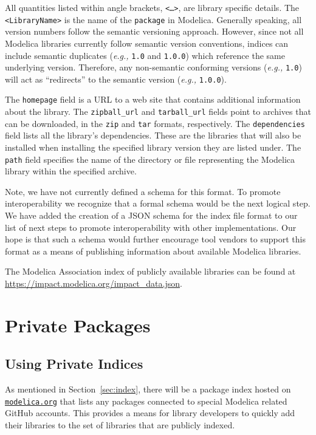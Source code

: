 \documentclass[11pt,a4paper,twocolumn]{article}
\newcommand{\code}[1]{\texttt{#1}} %
\begin{document}
All quantities listed within angle brackets, \code{<\ldots>}, are library
specific details.  The \code{<LibraryName>} is the name of the
\code{package} in Modelica.  Generally speaking, all version numbers
follow the semantic versioning approach.  However, since not all
Modelica libraries currently follow semantic version conventions,
indices can include semantic duplicates (\textit{e.g.,} \code{1.0} and
\code{1.0.0}) which reference the same underlying version.  Therefore,
any non-semantic conforming versions (\textit{e.g.,} \code{1.0}) will
act as ``redirects'' to the semantic version (\textit{e.g.,}
\code{1.0.0}).

The \code{homepage} field is a URL to a web site that contains
additional information about the library.  The \code{zipball\_url} and
\code{tarball\_url} fields point to archives that can be downloaded,
in the \code{zip} and \code{tar} formats, respectively.  The
\code{dependencies} field lists all the library's dependencies.  These
are the libraries that will also be installed when installing the
specified library version they are listed under.  The \code{path}
field specifies the name of the directory or file representing the
Modelica library within the specified archive.

Note, we have not currently defined a schema for this format.  To
promote interoperability we recognize that a formal schema would be the
next logical step.  We have added the creation of a JSON schema for
the index file format to our list of next steps to promote
interoperability with other implementations.  Our hope is that such a
schema would further encourage tool vendors to support this format as
a means of publishing information about available Modelica libraries.

The Modelica Association index of publicly available libraries can
be found at \url{https://impact.modelica.org/impact\_data.json}.

\section{Private Packages}
\label{sec:private}

\subsection{Using Private Indices}
\label{sec:use_private}

As mentioned in Section~\ref{sec:index}, there will be a package index
hosted on \href{https://modelica.org}{\code{modelica.org}} that lists
any packages connected to special Modelica related GitHub accounts.
This provides a means for library developers to quickly add their
libraries to the set of libraries that are publicly indexed.
\end{document}
